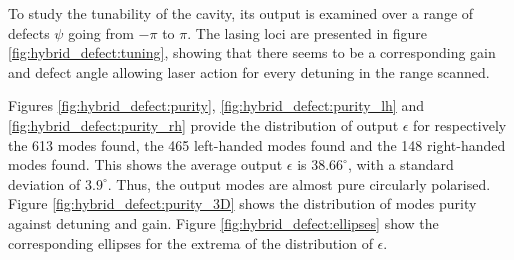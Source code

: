 To study the tunability of the cavity, its output is examined over a range of defects $\psi$ going from $-\pi$ to $\pi$. The lasing loci are presented in figure \ref{fig:hybrid_defect:tuning}, showing that there seems to be a corresponding gain and defect angle allowing laser action for every detuning in the range scanned. 

Figures \ref{fig:hybrid_defect:purity}, \ref{fig:hybrid_defect:purity_lh} and \ref{fig:hybrid_defect:purity_rh} provide the distribution of output $\epsilon$ for respectively the 613 modes found, the 465 left-handed modes found and the 148 right-handed modes found. This shows the average output $\epsilon$ is $38.66^\circ$, with a standard deviation of $3.9^\circ$. Thus, the output modes are almost pure circularly polarised. Figure \ref{fig:hybrid_defect:purity_3D} shows the distribution of modes purity against detuning and gain. Figure \ref{fig:hybrid_defect:ellipses} show the corresponding ellipses for the extrema of the distribution of $\epsilon$.

